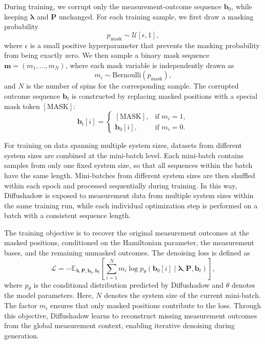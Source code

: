 \documentclass[pdflatex,sn-mathphys-num]{sn-jnl}%
\theoremstyle{thmstyleone}%
\theoremstyle{thmstyletwo}%
\theoremstyle{thmstylethree}%
\begin{document}
During training, we corrupt only the measurement-outcome sequence \(\mathbf{b}_0\), while keeping \(\boldsymbol{\lambda}\) and \(\mathbf{P}\) unchanged. For each training sample, we first draw a masking probability
\begin{equation}
p_{\mathrm{mask}} \sim \mathcal{U}[\epsilon, 1],
\end{equation}
where \(\epsilon\) is a small positive hyperparameter that prevents the masking probability from being exactly zero. We then sample a binary mask sequence \(\mathbf{m}=(m_1,\ldots,m_N)\), where each mask variable is independently drawn as
\begin{equation}
m_i \sim \mathrm{Bernoulli}(p_{\mathrm{mask}}),
\end{equation}
and \(N\) is the number of spins for the corresponding sample. The corrupted outcome sequence \(\mathbf{b}_t\) is constructed by replacing masked positions with a special mask token \([\mathrm{MASK}]\):
\begin{equation}
\label{eq:mask_fun}
\mathbf{b}_t[i] =
\begin{cases}
[\mathrm{MASK}], & \text{if } m_i = 1, \\
\mathbf{b}_0[i], & \text{if } m_i = 0 .
\end{cases}
\end{equation}

For training on data spanning multiple system sizes, datasets from different system sizes are combined at the mini-batch level. Each mini-batch contains samples from only one fixed system size, so that all sequences within the batch have the same length. Mini-batches from different system sizes are then shuffled within each epoch and processed sequentially during training. In this way, Diffushadow is exposed to measurement data from multiple system sizes within the same training run, while each individual optimization step is performed on a batch with a consistent sequence length.

The training objective is to recover the original measurement outcomes at the masked positions, conditioned on the Hamiltonian parameter, the measurement bases, and the remaining unmasked outcomes. The denoising loss is defined as
\begin{equation}
\label{eq:loss_fun}
\mathcal{L}
=
-\mathbb{E}_{\boldsymbol{\lambda},\mathbf{P},\mathbf{b}_0,\mathbf{b}_t}
\left[
\sum_{i=1}^{N}
m_i
\log
p_{\theta}
\left(
\mathbf{b}_0[i]
\mid
\boldsymbol{\lambda},\mathbf{P},\mathbf{b}_t
\right)
\right],
\end{equation}
where \(p_{\theta}\) is the conditional distribution predicted by Diffushadow and \(\theta\) denotes the model parameters. Here, \(N\) denotes the system size of the current mini-batch. The factor \(m_i\) ensures that only masked positions contribute to the loss. Through this objective, Diffushadow learns to reconstruct missing measurement outcomes from the global measurement context, enabling iterative denoising during generation.
\end{document}
